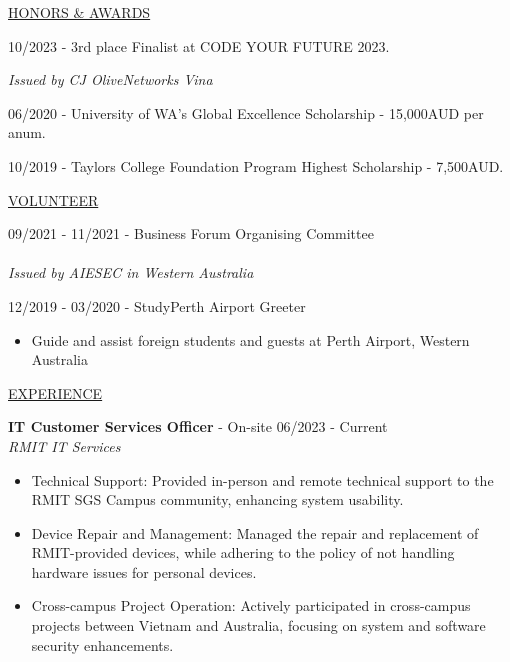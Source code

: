 \documentclass[11pt]{article}
\newcommand{\betteruline}[1]{
    \uline{#1}
}
\newcommand{\sectiontitle}[1]{
    \begingroup
        \titlebold
        \betteruline{\Large\uppercase{#1}  }
        \vspace{1.7mm}
    \endgroup
}
\newcommand{\sectioncontent}[1]{
    \begingroup
        \begin{FlushLeft}
        \vspace{-3mm}
        \sffamily\small#1
        \end{FlushLeft}
    \endgroup
    \vspace{2mm}
}
\newcommand{\job}[3]{
    \begingroup
        \textbf{\small#1} - \small#2
        \hfill\color{black!70}\small{#3}
    \endgroup
}
\newcommand{\spacevv}{
    \vspace{2mm}
}
\newcommand{\honor}[2]{
    \textcolor{black!70}{#1} - #2 \\
    \vspace{1.5mm}
}
\begin{document}
\begin{paracol}{2}
    \sectiontitle{Honors \& Awards}
    \sectioncontent{
        \honor{10/2023}{ 
        3rd place Finalist at CODE YOUR FUTURE 2023.}
        \textcolor{black!70}{\textit{Issued by CJ OliveNetworks Vina}} \\
        \spacevv
        \vspace{2mm}
        \honor{06/2020}{ University of WA's Global Excellence Scholarship - 15,000AUD per anum.}
        \vspace{2mm}
        \honor{10/2019}{Taylors College Foundation Program Highest Scholarship - 7,500AUD.}
    }

    \sectiontitle{Volunteer}
    \sectioncontent{
    \honor{09/2021 - 11/2021}{Business Forum Organising Committee } \\
    \textcolor{black!70}{\textit{Issued by AIESEC in Western Australia}} \\
    \spacevv
    \honor{12/2019 - 03/2020}{StudyPerth Airport Greeter}
    \begin{itemize}
        \item Guide and assist foreign students and guests at Perth Airport, Western Australia
    \end{itemize}
    }

    \switchcolumn

    \sectiontitle{Experience}
    \sectioncontent{
    \job{IT Customer Services Officer}{On-site}{06/2023 - Current} \\
      \textcolor{black!70}{\textit{RMIT IT Services}}
\vspace{1mm}
      \begin{itemize}
        \item Technical Support: Provided in-person and remote technical support to the RMIT SGS Campus community, enhancing system usability.
\vspace{1mm}
        \item Device Repair and Management: Managed the repair and replacement of RMIT-provided devices, while adhering to the policy of not handling hardware issues for personal devices.
\vspace{1mm}
        \item Cross-campus Project Operation: Actively participated in cross-campus projects between Vietnam and Australia, focusing on system and software security enhancements.
      \end{itemize}
      \spacevv
\vspace{2mm}
    }


\end{paracol}
\end{document}
